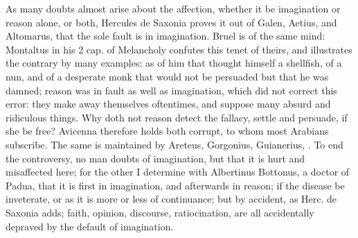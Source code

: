 {{As many doubts almost arise about the affection, whether it be
imagination or reason alone, or both, Hercules de Saxonia proves it out
of Galen, Aetius, and Altomarus, that the sole fault is in
imagination. Bruel is of the same mind: Montaltus in his 2 cap.
of Melancholy confutes this tenet of theirs, and illustrates the
contrary by many examples: as of him that thought himself a shellfish,
of a nun, and of a desperate monk that would not be persuaded but that
he was damned; reason was in fault as well as imagination, which did
not correct this error: they make away themselves oftentimes, and
suppose many absurd and ridiculous things. Why doth not reason detect
the fallacy, settle and persuade, if she be free? Avicenna
therefore holds both corrupt, to whom most Arabians subscribe. The same
is maintained by Areteus, Gorgonius, Guianerius, \etc{}. To end
the controversy, no man doubts of imagination, but that it is hurt and
misaffected here; for the other I determine with  Albertinus
Bottonus, a doctor of Padua, that it is first in imagination, and
afterwards in reason; if the disease be inveterate, or as it is more or
less of continuance; but by accident, as Herc. de Saxonia adds;
faith, opinion, discourse, ratiocination, are all accidentally depraved
by the default of imagination.

}}

